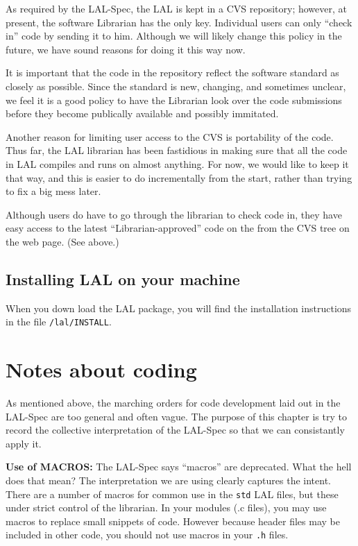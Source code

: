 \documentclass[oneside]{book}
\begin{document}
As required by the LAL-Spec, the LAL is kept in a CVS repository;
however, at present, the software Librarian has the only key.
Individual users can only ``check in'' code by sending it to him.
Although we will likely change this policy in the future, we have
sound reasons for doing it this way now. 

It is important that the code in the repository reflect the software
standard as closely as possible.  Since the standard is new, changing,
and sometimes unclear, we feel it is a good policy to have the
Librarian look over the code submissions before they become publically
available and possibly immitated.

Another reason for limiting user access to the CVS is portability of
the code.  Thus far, the LAL librarian has been fastidious in making
sure that all the code in  LAL compiles and runs on almost anything.
For now, we would like to keep it that way, and this is easier to do
incrementally from the start, rather than trying to fix a big mess
later.

Although users do have to go through the librarian to check code in,
they have easy access to the latest ``Librarian-approved'' code on the
from the CVS tree on the web page. (See above.)

\section{Installing LAL on your machine}

When you down load the LAL package, you will find the installation
instructions in the file {\tt /lal/INSTALL}.

\chapter{Notes about coding}
\label{c:CodingNotes}

As mentioned above,  the marching orders for code development laid out
in the LAL-Spec are too general and often vague.  The purpose of this
chapter is try to record the collective interpretation of the LAL-Spec
so  that we can consistantly apply it.

\bigskip

{\noindent \bf Use of MACROS:} The LAL-Spec says ``macros'' are
deprecated.  What the hell does that mean? The interpretation we are
using clearly captures the intent.  There are a number of macros for
common use in the {\tt std} LAL files, but these under strict control
of the librarian.  In your modules (.c files), you may use macros to
replace small snippets of code.  However because header files may be
included in other code, you should not use macros in your {\tt .h}
files.
\end{document}
